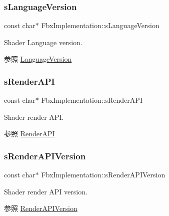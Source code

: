 \subsubsection{\texorpdfstring{s\+Language\+Version}{sLanguageVersion}}
{\footnotesize\ttfamily const char$\ast$ Fbx\+Implementation\+::s\+Language\+Version\hspace{0.3cm}{\ttfamily [static]}}

Shader Language version. \begin{DoxySeeAlso}{参照}
\hyperlink{class_fbx_implementation_aebb544e23225701b6e92cd058bc09bab}{Language\+Version} 
\end{DoxySeeAlso}
\mbox{\label{class_fbx_implementation_a6c5b03fd6433bbe70f3cd1868d52fdd1}} 
\subsubsection{\texorpdfstring{s\+Render\+A\+PI}{sRenderAPI}}
{\footnotesize\ttfamily const char$\ast$ Fbx\+Implementation\+::s\+Render\+A\+PI\hspace{0.3cm}{\ttfamily [static]}}

Shader render A\+PI. \begin{DoxySeeAlso}{参照}
\hyperlink{class_fbx_implementation_ac127174c10e30bdf28d2e276c7818302}{Render\+A\+PI} 
\end{DoxySeeAlso}
\mbox{\label{class_fbx_implementation_aa1ca5cd4df0e11b8f3df06eeb6650627}} 
\subsubsection{\texorpdfstring{s\+Render\+A\+P\+I\+Version}{sRenderAPIVersion}}
{\footnotesize\ttfamily const char$\ast$ Fbx\+Implementation\+::s\+Render\+A\+P\+I\+Version\hspace{0.3cm}{\ttfamily [static]}}

Shader render A\+PI version. \begin{DoxySeeAlso}{参照}
\hyperlink{class_fbx_implementation_a66ac67e482f39a4e71389f33f1c69648}{Render\+A\+P\+I\+Version} 
\end{DoxySeeAlso}
\mbox{\label{class_fbx_implementation_a9590713869bf7ee6b320ff49df12e5e5}} 
